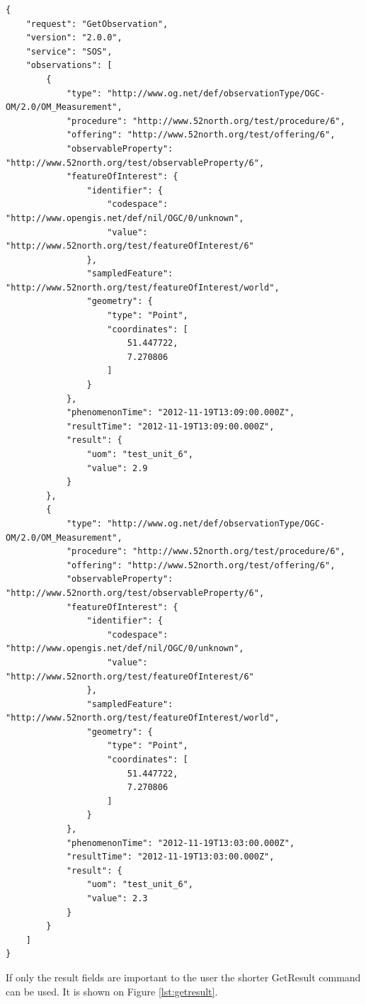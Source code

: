 \begin{lstlisting}[caption={JSON GetObservation response\label{lst:sendobs}}]
{
    "request": "GetObservation",
    "version": "2.0.0",
    "service": "SOS",
    "observations": [
        {
            "type": "http://www.og.net/def/observationType/OGC-OM/2.0/OM_Measurement",
            "procedure": "http://www.52north.org/test/procedure/6",
            "offering": "http://www.52north.org/test/offering/6",
            "observableProperty": "http://www.52north.org/test/observableProperty/6",
            "featureOfInterest": {
                "identifier": {
                    "codespace": "http://www.opengis.net/def/nil/OGC/0/unknown",
                    "value": "http://www.52north.org/test/featureOfInterest/6"
                },
                "sampledFeature": "http://www.52north.org/test/featureOfInterest/world",
                "geometry": {
                    "type": "Point",
                    "coordinates": [
                        51.447722,
                        7.270806
                    ]
                }
            },
            "phenomenonTime": "2012-11-19T13:09:00.000Z",
            "resultTime": "2012-11-19T13:09:00.000Z",
            "result": {
                "uom": "test_unit_6",
                "value": 2.9
            }
        },
        {
            "type": "http://www.og.net/def/observationType/OGC-OM/2.0/OM_Measurement",
            "procedure": "http://www.52north.org/test/procedure/6",
            "offering": "http://www.52north.org/test/offering/6",
            "observableProperty": "http://www.52north.org/test/observableProperty/6",
            "featureOfInterest": {
                "identifier": {
                    "codespace": "http://www.opengis.net/def/nil/OGC/0/unknown",
                    "value": "http://www.52north.org/test/featureOfInterest/6"
                },
                "sampledFeature": "http://www.52north.org/test/featureOfInterest/world",
                "geometry": {
                    "type": "Point",
                    "coordinates": [
                        51.447722,
                        7.270806
                    ]
                }
            },
            "phenomenonTime": "2012-11-19T13:03:00.000Z",
            "resultTime": "2012-11-19T13:03:00.000Z",
            "result": {
                "uom": "test_unit_6",
                "value": 2.3
            }
        }
    ]
}
\end{lstlisting}

If only the result fields are important to the user the shorter GetResult command can be used. It is shown on Figure \ref{lst:getresult}.

